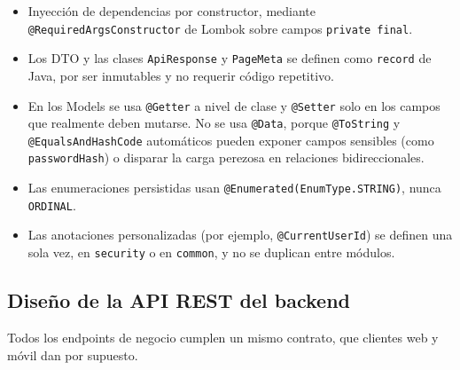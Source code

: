 \begin{itemize}
    \item Inyección de dependencias por constructor, mediante \texttt{@RequiredArgsConstructor} de Lombok sobre campos \texttt{private final}.
    \item Los DTO y las clases \texttt{ApiResponse} y \texttt{PageMeta} se definen como \texttt{record} de Java, por ser inmutables y no requerir código repetitivo.
    \item En los Models se usa \texttt{@Getter} a nivel de clase y \texttt{@Setter} solo en los campos que realmente deben mutarse. No se usa \texttt{@Data}, porque \texttt{@ToString} y \texttt{@EqualsAndHashCode} automáticos pueden exponer campos sensibles (como \texttt{passwordHash}) o disparar la carga perezosa en relaciones bidireccionales.
    \item Las enumeraciones persistidas usan \texttt{@Enumerated(EnumType.STRING)}, nunca \texttt{ORDINAL}.
    \item Las anotaciones personalizadas (por ejemplo, \texttt{@CurrentUserId}) se definen una sola vez, en \texttt{security} o en \texttt{common}, y no se duplican entre módulos.
\end{itemize}

\subsection{Diseño de la API REST del backend}

Todos los endpoints de negocio cumplen un mismo contrato, que clientes web y móvil dan por supuesto.

